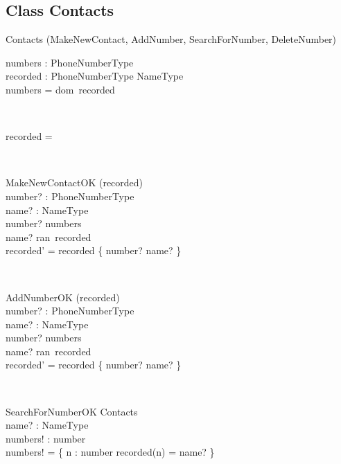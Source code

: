 \documentclass[12pt]{article}
\begin{document}
\begin{spacing}{1.5}
\subsection{Class Contacts}
\begin{class}{Contacts}
\also
\upharpoonright (MakeNewContact, AddNumber, SearchForNumber, DeleteNumber) \\
\begin{state}
numbers :  PhoneNumberType\\
recorded : PhoneNumberType \pfun NameType\\
\where
numbers = dom~recorded \\
\end{state} \\
\begin{init}
recorded = \emptyset \\ %
\end{init} \\
\begin{op}{MakeNewContactOK}
\Delta (recorded) \\
number? : PhoneNumberType\\
name? : NameType\\
\ST
number? \notin numbers\\
name? \notin ran~recorded\\
recorded' = recorded \cup \{ number? \mapsto name? \} \\
\end{op}\\
\begin{op}{AddNumberOK}
\Delta (recorded) \\
number? : PhoneNumberType\\
name? : NameType\\
\ST
number? \notin numbers\\
name? \in ran~recorded\\
recorded' = recorded \cup \{ number? \mapsto name? \} \\
\end{op}\\
\begin{op}{SearchForNumberOK}
\Xi Contacts\\
name? : NameType\\
numbers! : \pset number\\
\ST
numbers! = \{ n : number \cbar recorded(n) = name? \}
\end{op}\\

\end{class}
\end{spacing}
\end{document}

